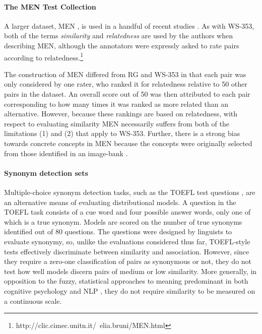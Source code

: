 \paragraph{\bf The MEN Test Collection} A larger dataset, MEN \citep{bruni2014multimodal}, is used in a handful of recent studies \citep{bruni2012distributional2,bernardi2013relatedness}. As with WS-353, both of the terms \emph{similarity} and \emph{relatedness} are used by the authors when describing MEN, although the annotators were expressly asked to rate pairs according to relatedness.\footnote{http://clic.cimec.unitn.it/~elia.bruni/MEN.html} 

The construction of MEN differed from RG and WS-353 in that each pair was only considered by one rater, who ranked it for relatedness relative to 50 other pairs in the dataset. An overall score out of 50 was then attributed to each pair corresponding to how many times it was ranked as more related than an alternative. However, because these rankings are based on relatedness, with respect to evaluating similarity MEN necessarily suffers from both of the limitations (1) and (2) that apply to WS-353. Further, there is a strong bias towards concrete concepts in MEN because the concepts were originally selected from those identified in an image-bank \cite{bruni2012distributional}.  

\paragraph{\bf Synonym detection sets} Multiple-choice synonym detection tasks, such as the TOEFL test questions \citep{landauer1997solution}, are an alternative means of evaluating distributional models. A question in the TOEFL task consists of a cue word and four possible answer words, only one of which is a true synonym. Models are scored on the number of true synonyms identified out of 80 questions. The questions were designed by linguists to evaluate synonymy, so, unlike the evaluations considered thus far, TOEFL-style tests effectively discriminate between similarity and association. However, since they require a zero-one classification of pairs as synonymous or not, they do not test how well models discern pairs of medium or low similarity. More generally, in opposition to the  fuzzy, statistical approaches to meaning predominant in both cognitive psychology \citep{griffiths2007topics} and NLP \citep{turney2010frequency}, they do not require similarity to be measured on a continuous scale.

